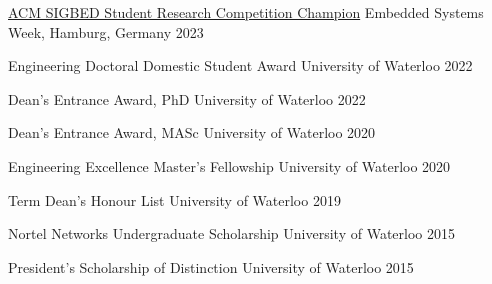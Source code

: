 
\begin{cvhonors}

\cvhonor
{\href{https://src.acm.org/winners/2024}{ACM SIGBED Student Research Competition Champion}}
{Embedded Systems Week, Hamburg, Germany}
{}
{2023}

  \cvhonor
    {Engineering Doctoral Domestic Student Award} %
    {University of Waterloo} %
    {} %
    {2022} %

  \cvhonor
    {Dean's Entrance Award, PhD} %
    {University of Waterloo} %
    {} %
    {2022} %

  \cvhonor
    {Dean's Entrance Award, MASc} %
    {University of Waterloo} %
    {} %
    {2020} %

  \cvhonor
    {Engineering Excellence Master's Fellowship} %
    {University of Waterloo} %
    {} %
    {2020} %

  \cvhonor
    {Term Dean's Honour List} %
    {University of Waterloo} %
    {} %
    {2019} %

  \cvhonor
    {Nortel Networks Undergraduate Scholarship} %
    {University of Waterloo} %
    {} %
    {2015} %

  \cvhonor
    {President’s Scholarship of Distinction} %
    {University of Waterloo} %
    {} %
    {2015} %
    
\end{cvhonors}
